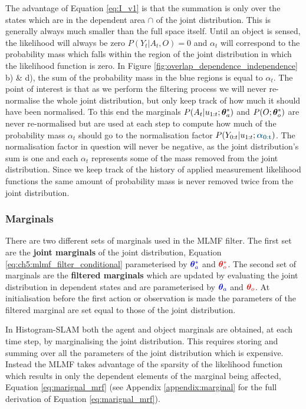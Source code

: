 The advantage of Equation \ref{eq:I_v1} is that the summation is only over the states which are in the dependent area $\cap$ of the joint 
distribution. This is generally always much smaller than the full space itself.
Until an object is sensed, the likelihood will always be zero $P(Y_t|A_t,O) = 0$ and $\alpha_t$ will correspond to the probability 
mass which falls within the region of the joint distribution in which the likelihood function is zero. In Figure 
\ref{fig:overlap_dependence_independence} b) \& d), the sum of the probability mass in the blue 
regions is equal to $\alpha_t$.
The point of interest is that as we perform the filtering process we will never re-normalise the whole joint distribution, but only keep 
track of how much it should have been normalised. To this end the marginals  $P(A_t|u_{1:t};\boldsymbol{\theta}^*_a)$ and $P(O;\boldsymbol{\theta}^*_o)$  are never re-normalised but are used
at each step to compute how much of the probability mass $\alpha_t$ should go to the normalisation factor $P(Y_{0:t}|u_{1:t};\mathcolor{dark-blue}{\BAlph})$. 
The normalisation factor in question will never be negative, as the joint distribution's sum is one and each $\alpha_t$ represents some of the mass removed from the joint distribution. Since we 
keep track of the history of applied  measurement likelihood functions the same amount of probability mass is never removed twice
from the joint distribution.

\subsubsection{Marginals}

There are two different sets of marginals used in the MLMF filter. The first set are the \textbf{joint marginals} of the joint distribution, Equation \ref{eq:ch5:mlmf_filter_conditional}
parameterised by $\mathcolor{blue}{\ThAs}$ and $\mathcolor{red}{\ThOs}$. The second set of marginals are the \textbf{filtered marginals} which are updated by evaluating the joint distribution in dependent states and 
are parameterised by $\mathcolor{blue}{\ThA}$ and $\mathcolor{red}{\ThO}$. At initialisation before the first action or observation is made 
the parameters of the filtered marginal are set equal to those of the joint distribution.

In Histogram-SLAM both the agent and object marginals are obtained, at each time step, by marginalising the joint distribution.
This requires storing and summing over all the parameters of the joint distribution which is expensive.
Instead the MLMF takes advantage of the sparsity of the likelihood function which results in only the dependent elements of the marginal being affected, 
Equation \ref{eq:marignal_mrf} (see Appendix \ref{appendix:marginal} for the full derivation of Equation \ref{eq:marignal_mrf}). 

